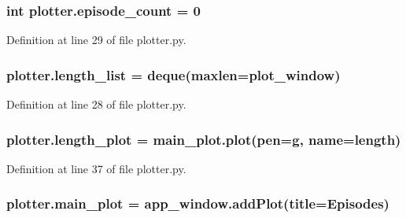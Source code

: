 \subsubsection[{\texorpdfstring{episode\+\_\+count}{episode_count}}]{\setlength{\rightskip}{0pt plus 5cm}int plotter.\+episode\+\_\+count = 0}\hypertarget{namespaceplotter_aec1d6d729c0b25355f045e1f5bdc588f}{}\label{namespaceplotter_aec1d6d729c0b25355f045e1f5bdc588f}


Definition at line 29 of file plotter.\+py.

\subsubsection[{\texorpdfstring{length\+\_\+list}{length_list}}]{\setlength{\rightskip}{0pt plus 5cm}plotter.\+length\+\_\+list = deque(maxlen={\bf plot\+\_\+window})}\hypertarget{namespaceplotter_ab7eba5fc23c3791ab6bca7c5c975d2b8}{}\label{namespaceplotter_ab7eba5fc23c3791ab6bca7c5c975d2b8}


Definition at line 28 of file plotter.\+py.

\subsubsection[{\texorpdfstring{length\+\_\+plot}{length_plot}}]{\setlength{\rightskip}{0pt plus 5cm}plotter.\+length\+\_\+plot = main\+\_\+plot.\+plot(pen=\textquotesingle{}g\textquotesingle{}, name=\textquotesingle{}length\textquotesingle{})}\hypertarget{namespaceplotter_ac0842708a1e94becc6bb776a68a9ac5f}{}\label{namespaceplotter_ac0842708a1e94becc6bb776a68a9ac5f}


Definition at line 37 of file plotter.\+py.

\subsubsection[{\texorpdfstring{main\+\_\+plot}{main_plot}}]{\setlength{\rightskip}{0pt plus 5cm}plotter.\+main\+\_\+plot = app\+\_\+window.\+add\+Plot(title=\textquotesingle{}Episodes\textquotesingle{})}\hypertarget{namespaceplotter_a40d656a97d2e7039f17ee5742490ecf9}{}\label{namespaceplotter_a40d656a97d2e7039f17ee5742490ecf9}


